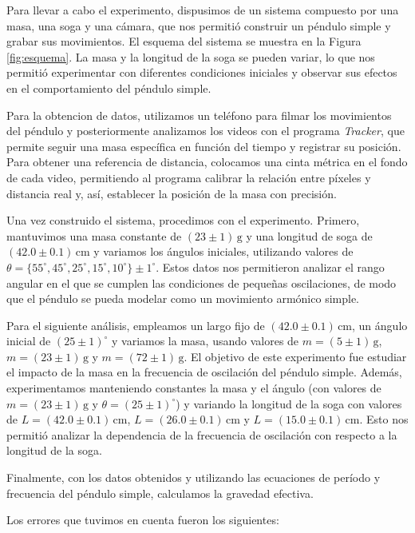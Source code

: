 \documentclass[12pt,a4]{article}
\begin{document}
Para llevar a cabo el experimento, dispusimos de un sistema compuesto por una masa, una soga y una cámara, que nos permitió construir un péndulo simple y grabar sus movimientos. El esquema del sistema se muestra en la Figura \ref{fig:esquema}. La masa y la longitud de la soga se pueden variar, lo que nos permitió experimentar con diferentes condiciones iniciales y observar sus efectos en el comportamiento del péndulo simple.

Para la obtencion de datos, utilizamos un teléfono para filmar los movimientos del péndulo y posteriormente analizamos los videos con el programa \textit{Tracker}, que permite seguir una masa específica en función del tiempo y registrar su posición. Para obtener una referencia de distancia, colocamos una cinta métrica en el fondo de cada video, permitiendo al programa calibrar la relación entre píxeles y distancia real y, así, establecer la posición de la masa con precisión.

Una vez construido el sistema, procedimos con el experimento. Primero, mantuvimos una masa constante de $(23 \pm 1) \, \text{g}$ y una longitud de soga de $(42.0 \pm 0.1) \, \text{cm}$ y variamos los ángulos iniciales, utilizando valores de $\theta = \{55^\circ, 45^\circ, 25^\circ, 15^\circ, 10^\circ\} \pm 1^\circ$. Estos datos nos permitieron analizar el rango angular en el que se cumplen las condiciones de pequeñas oscilaciones, de modo que el péndulo se pueda modelar como un movimiento armónico simple.

Para el siguiente análisis, empleamos un largo fijo de $(42.0 \pm 0.1) \, \text{cm}$, un ángulo inicial de $(25 \pm 1)^\circ$ y variamos la masa, usando valores de $m = (5 \pm 1) \, \text{g}$, $m = (23 \pm 1) \, \text{g}$ y $m = (72 \pm 1) \, \text{g}$. El objetivo de este experimento fue estudiar el impacto de la masa en la frecuencia de oscilación del péndulo simple. Además, experimentamos manteniendo constantes la masa y el ángulo (con valores de $m = (23 \pm 1) \, \text{g}$ y $\theta = (25 \pm 1)^\circ$) y variando la longitud de la soga con valores de $L = (42.0 \pm 0.1) \, \text{cm}$, $L = (26.0 \pm 0.1) \, \text{cm}$ y $L = (15.0 \pm 0.1) \, \text{cm}$. Esto nos permitió analizar la dependencia de la frecuencia de oscilación con respecto a la longitud de la soga.

Finalmente, con los datos obtenidos y utilizando las ecuaciones de período y frecuencia del péndulo simple, calculamos la gravedad efectiva.


Los errores que tuvimos en cuenta fueron los siguientes:
\end{document}
